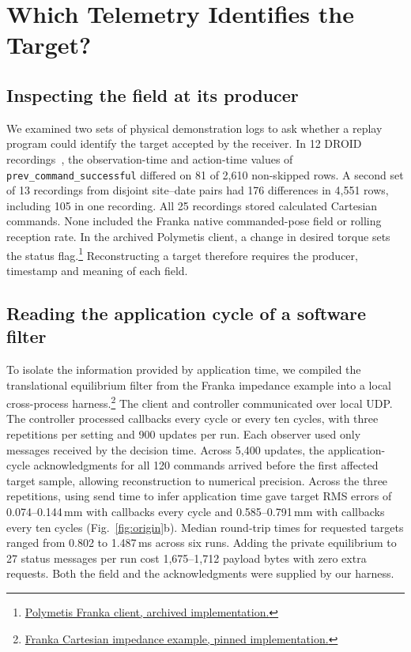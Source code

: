 \section{Which Telemetry Identifies the Target?}
\subsection{Inspecting the field at its producer}
We examined two sets of physical demonstration logs to ask whether a replay program could identify the target accepted by the receiver. In 12 DROID recordings~\cite{droid2024}, the observation-time and action-time values of \texttt{prev\_command\_successful} differed on 81 of 2,610 non-skipped rows. A second set of 13 recordings from disjoint site--date pairs had 176 differences in 4,551 rows, including 105 in one recording. All 25 recordings stored calculated Cartesian commands. None included the Franka native commanded-pose field or rolling reception rate. In the archived Polymetis client, a change in desired torque sets the status flag.\footnote{\href{https://github.com/facebookresearch/fairo/blob/0a01a7fa7a7c65b2f9a3aebf5e79040940daf9d2/polymetis/polymetis/src/clients/franka_panda_client/franka_panda_client.cpp}{Polymetis Franka client, archived implementation.}} Reconstructing a target therefore requires the producer, timestamp and meaning of each field.

\subsection{Reading the application cycle of a software filter}
To isolate the information provided by application time, we compiled the translational equilibrium filter from the Franka impedance example into a local cross-process harness.\footnote{\href{https://github.com/frankarobotics/franka_ros/blob/35e1f654426e04bc9f83b73af4ab68a3fb145c84/franka_example_controllers/src/cartesian_impedance_example_controller.cpp}{Franka Cartesian impedance example, pinned implementation.}} The client and controller communicated over local UDP. The controller processed callbacks every cycle or every ten cycles, with three repetitions per setting and 900 updates per run. Each observer used only messages received by the decision time. Across 5,400 updates, the application-cycle acknowledgments for all 120 commands arrived before the first affected target sample, allowing reconstruction to numerical precision. Across the three repetitions, using send time to infer application time gave target RMS errors of 0.074--0.144\,mm with callbacks every cycle and 0.585--0.791\,mm with callbacks every ten cycles (Fig.~\ref{fig:origin}b). Median round-trip times for requested targets ranged from 0.802 to 1.487\,ms across six runs. Adding the private equilibrium to 27 status messages per run cost 1,675--1,712 payload bytes with zero extra requests. Both the field and the acknowledgments were supplied by our harness.

